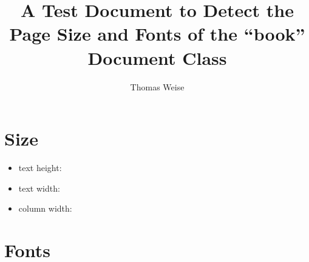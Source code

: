 \documentclass{book}%
\begin{document}
%
%
\title{A Test Document to Detect the Page Size and Fonts of the ``book'' Document Class}%
\author{Thomas Weise}%
%
\maketitle%
%
%
\chapter{Size}%
%
\begin{itemize}%
\item text height: \the\textheight%
\item text width: \the\textwidth%
\item column width: \the\columnwidth%
\end{itemize}%
%
\chapter{Fonts}%
%
\end{document}
